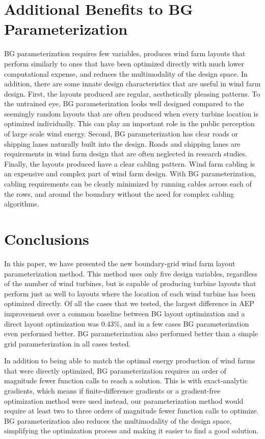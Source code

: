 \documentclass[wes, manuscript]{copernicus}
\begin{document}
\section{Additional Benefits to BG Parameterization}

BG parameterization requires few variables, produces wind farm layouts that perform similarly to ones that have been optimized directly with much lower computational expense, and reduces the multimodality of the design space. In addition, there are some innate design characteristics that are useful in wind farm design. First, the layouts produced are regular, aesthetically pleasing patterns. To the untrained eye, BG parameterization looks well designed compared to the seemingly random layouts that are often produced when every turbine location is optimized individually. This can play an important role in the public perception of large scale wind energy. Second, BG parameterization has clear roads or shipping lanes naturally built into the design. Roads and shipping lanes are requirements in wind farm design that are often neglected in research studies. Finally, the layouts produced have a clear cabling pattern. Wind farm cabling is an expensive and complex part of wind farm design. With BG parameterization, cabling requirements can be clearly minimized by running cables across each of the rows, and around the boundary without the need for complex cabling algorithms.


\section{Conclusions}
In this paper, we have presented the new boundary-grid wind farm layout parameterization method. This method uses only five design variables, regardless of the number of wind turbines, but is capable of producing turbine layouts that perform just as well to layouts where the location of each wind turbine has been optimized directly. Of all the cases that we tested, the largest difference in AEP improvement over a common baseline between BG layout optimization and a direct layout optimization was 0.43\%, and in a few cases BG parameterization even performed better. BG parameterization also performed better than a simple grid parameterization in all cases tested. 

In addition to being able to match the optimal energy production of wind farms that were directly optimized, BG parameterization requires an order of magnitude fewer function calls to reach a solution. This is with exact-analytic gradients, which means if finite-difference gradients or a gradient-free optimization method were used instead, our parameterization method would require at least two to three orders of magnitude fewer function calls to optimize.
%
BG parameterization also reduces the multimodality of the design space, simplifying the optimization process and making it easier to find a good solution.
\end{document}
